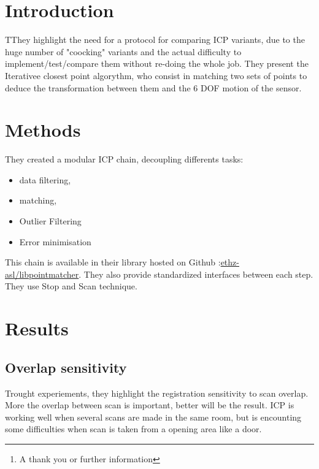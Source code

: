 \documentclass[twoside,twocolumn]{article}
\title{\citetitle{pomerleau_comparing_2013}} %
\author{%
\textsc{Virgile Daugé}\thanks{A thank you or further information} \\[1ex] %
\normalsize University of Lorraine \\ %
\normalsize \href{mailto:virgile.dauge@inria.fr}{virgile.dauge@inria.fr} %
}
\date{\today} %
\begin{document}
\maketitle


\section{Introduction}

\lettrine[nindent=0em,lines=3]{T}They highlight the need for a protocol for comparing ICP variants, due to the huge number of "coocking" variants and the actual difficulty to implement/test/compare them without re-doing the whole job.
They present the Iterativee closest point algorythm, who consist in matching two sets of points to deduce the transformation between them and the 6 DOF motion of the sensor.


\section{Methods}
They created a modular ICP chain, decoupling differents tasks:
\begin{itemize}
  \item data filtering,
  \item matching,
  \item Outlier Filtering
  \item Error minimisation
\end{itemize}

This chain is available in their library hosted on Github :\href{https://github.com/ethz-asl/libpointmatcher}{ethz-asl/libpointmatcher}.
They also provide standardized interfaces between each step.
They use Stop and Scan technique.

\section{Results}
\subsection{Overlap sensitivity}
Trought experiements, they highlight the registration sensitivity to scan overlap. More the overlap between scan is important, better will be the result.
ICP is working well when several scans are made in the same room, but is encounting some difficulties when scan is taken from a opening area like a door.
\end{document}
